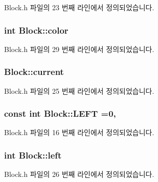 Block.\+h 파일의 23 번째 라인에서 정의되었습니다.

\subsubsection[{\texorpdfstring{color}{color}}]{\setlength{\rightskip}{0pt plus 5cm}int Block\+::color}\hypertarget{class_block_a11fa34418f20b6613d0ceeea8fc71d25}{}\label{class_block_a11fa34418f20b6613d0ceeea8fc71d25}


Block.\+h 파일의 29 번째 라인에서 정의되었습니다.

\subsubsection[{\texorpdfstring{current}{current}}]{ Block\+::current}\hypertarget{class_block_aeb5dd312b719966752ba4b38720a4535}{}\label{class_block_aeb5dd312b719966752ba4b38720a4535}


Block.\+h 파일의 25 번째 라인에서 정의되었습니다.

\subsubsection[{\texorpdfstring{L\+E\+FT}{LEFT}}]{\setlength{\rightskip}{0pt plus 5cm}const int Block\+::\+L\+E\+FT =0\hspace{0.3cm}{\ttfamily [static]}, {\ttfamily [private]}}\hypertarget{class_block_ac5f5e2234205915a274e7aa43a476a62}{}\label{class_block_ac5f5e2234205915a274e7aa43a476a62}


Block.\+h 파일의 16 번째 라인에서 정의되었습니다.

\subsubsection[{\texorpdfstring{left}{left}}]{\setlength{\rightskip}{0pt plus 5cm}int Block\+::left}\hypertarget{class_block_a1e4846853623ef67785a1bae5cec623e}{}\label{class_block_a1e4846853623ef67785a1bae5cec623e}


Block.\+h 파일의 26 번째 라인에서 정의되었습니다.

